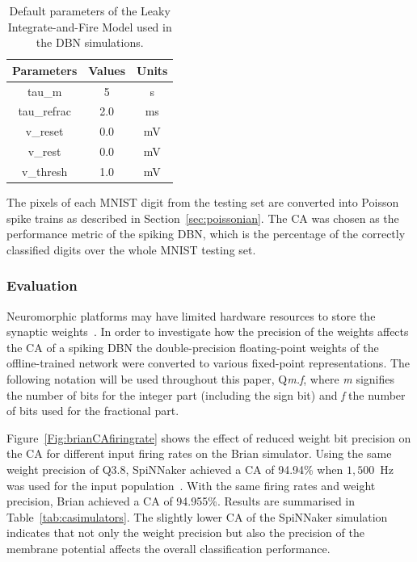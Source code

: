 \documentclass{frontiersENG} %
\begin{document}
\begin{table}[hbbp]
	\centering
	\caption{\label{Tab:NeuralParams}Default parameters of the Leaky Integrate-and-Fire Model used in the DBN simulations.}
	\bgroup
	\def\arraystretch{1.3}
	\begin{tabular}{c c c}
		Parameters & Values & Units \\
		\hline
		tau\_m & 5 & s\\
		tau\_refrac & 2.0 & ms\\
		v\_reset & 0.0 & mV\\
		v\_rest & 0.0 & mV\\
		v\_thresh & 1.0 & mV\\
	\end{tabular}
	\egroup
\end{table}

The pixels of each MNIST digit from the testing set are converted into Poisson spike trains as described in Section~\ref{sec:poissonian}. %
The CA was chosen as the performance metric of the spiking DBN, which is the percentage of the correctly classified digits over the whole MNIST testing set.

\subsubsection{Evaluation}
Neuromorphic platforms may have limited hardware resources to store the synaptic weights~\citep{schemmel2010wafer,merolla2014million}. In order to investigate how the precision of the weights affects the CA of a spiking DBN the double-precision floating-point weights of the offline-trained network were converted to various fixed-point representations. The following notation will be used throughout this paper, Q\textit{m.f}, where \textit{m} signifies the number of bits for the integer part (including the sign bit) and \textit{f} the number of bits used for the fractional part.

Figure~\ref{Fig:brianCAfiringrate} shows the effect of reduced weight bit precision on the CA for different input firing rates on the Brian simulator.
Using the same weight precision of Q3.8, SpiNNaker achieved a CA of 94.94\% when $1,500$~Hz was used for the input population~\citep{Stromatias2015scalable}. With the same firing rates and weight precision, Brian achieved a CA of 94.955\%. Results are summarised in Table~\ref{tab:casimulators}.
The slightly lower CA of the SpiNNaker simulation indicates that not only the weight precision but also the precision of the membrane potential affects the overall classification performance.    
\end{document}

